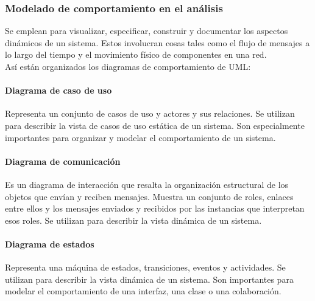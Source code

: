 \subsubsection{Modelado de comportamiento en el análisis}
Se emplean para visualizar, especificar, construir y documentar los aspectos dinámicos de un sistema. Estos involucran cosas tales como el flujo de mensajes a lo largo del tiempo y el movimiento físico de componentes en una red.\\
Así están organizados los diagramas de comportamiento de UML:
\begin{comment}
\begin{description}
\item[Diagramas de caso de uso] Organiza los comportamientos del sistema.
\item[Diagramas de secuencia] Centrados en la ordenación temporal de los mensajes.
\item[Diagramas de comunicación] Centrados en la organización estructural de los objetos que envían y reciben mensajes.
\item[Diagramas de estados] Centrados en el estado cambiante de un sistema dirigido por eventos.
\item[Diagramas de actividades] Centrados en el flujo de control de actividades.
\end{description}
\end{comment}
\paragraph{Diagrama de caso de uso} 
Representa un conjunto de casos de uso y actores y sus relaciones. Se utilizan para describir la vista de casos de uso estática de un sistema. Son especialmente importantes para organizar y modelar el comportamiento de un sistema.
\paragraph{Diagrama de comunicación}
Es un diagrama de interacción que resalta la organización estructural de los objetos que envían y reciben mensajes. Muestra un conjunto de roles, enlaces entre ellos y los mensajes enviados y recibidos por las instancias que interpretan esos roles. Se utilizan para describir la vista dinámica de un sistema.
\paragraph{Diagrama de estados}
Representa una máquina de estados, transiciones, eventos y actividades. Se utilizan para describir la vista dinámica de un sistema. Son importantes para modelar el comportamiento de una interfaz, una clase o una colaboración.
